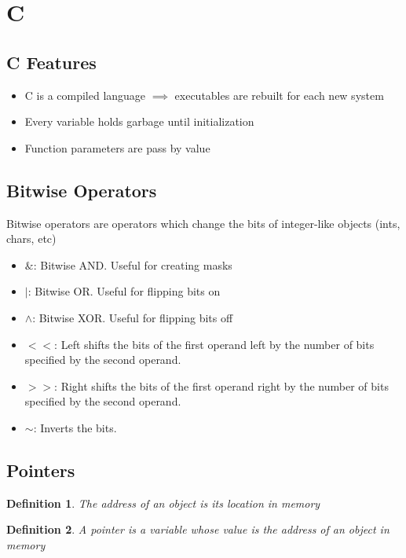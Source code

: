 \documentclass{article}
\newtheorem{definition}{Definition}
\begin{document}
\section{C}
\subsection{C Features}
\begin{itemize}
    \item C is a compiled language $\implies$ executables are rebuilt for each new system
    \item Every variable holds garbage until initialization
    \item Function parameters are pass by value
\end{itemize}
\subsection{Bitwise Operators}
Bitwise operators are operators which change the bits of integer-like objects (ints, chars, etc)
\begin{itemize}
    \item $\&$: Bitwise AND. Useful for creating masks
    \item $|$: Bitwise OR. Useful for flipping bits on
    \item $\wedge$: Bitwise XOR. Useful for flipping bits off
    \item $<<$: Left shifts the bits of the first operand left by the number of bits specified by the second operand.
    \item $>>$: Right shifts the bits of the first operand right by the number of bits specified by the second operand.
    \item $\sim$: Inverts the bits.
\end{itemize}
\subsection{Pointers}
\begin{definition}
    The address of an object is its location in memory
\end{definition}
\begin{definition}
    A pointer is a variable whose value is the address of an object in memory
\end{definition}
\end{document}
